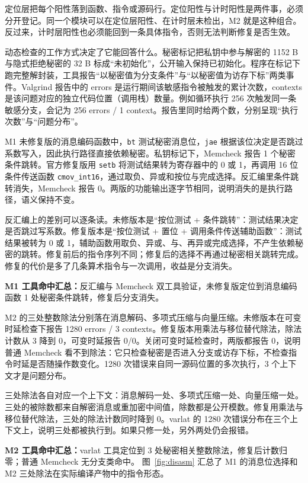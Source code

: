 定位层把每个阳性落到函数、指令或源码行。定位阳性与计时阳性是两件事，必须分开登记。同一个模块可以在定位层阳性、在计时层未检出，M2 就是这种组合。反过来，计时层阳性也必须能回到一条具体指令，否则无法判断修复是否生效。

动态检查的工作方式决定了它能回答什么。秘密标记把私钥中参与解密的 1152 B 与隐式拒绝秘密的 32 B 标成“未初始化”，公开输入保持已初始化。程序在标记下跑完整解封装，工具报告“以秘密值为分支条件”与“以秘密值为访存下标”两类事件。Valgrind 报告中的 errors 是运行期间该敏感指令被触发的累计次数，contexts 是该问题对应的独立代码位置（调用栈）数量。例如循环执行 256 次触发同一条敏感分支，会记为 256 errors / 1 context。报告里同时给两个数，分别呈现“执行次数”与“问题分布”。

M1 未修复版的消息编码函数中，\texttt{bt} 测试秘密消息位，\texttt{jae} 根据该位决定是否跳过系数写入，因此执行路径直接依赖秘密。私钥标记下，Memcheck 报告 1 个秘密条件跳转。官方修复版用 \texttt{setb} 将测试结果转为寄存器中的 0 或 1，再调用 16 位条件传送函数 \texttt{cmov\_int16}，通过取负、异或和按位与完成选择。反汇编里条件跳转消失，Memcheck 报告 0。两版的功能输出逐字节相同，说明消失的是执行路径，语义保持不变。\cite{clangover} %

反汇编上的差别可以逐条读。未修版本是“按位测试 + 条件跳转”：测试结果决定是否跳过写系数。修复版本是“按位测试 + 置位 + 调用条件传送辅助函数”：测试结果被转为 0 或 1，辅助函数用取负、异或、与、再异或完成选择，不产生依赖秘密的跳转。修复前后的指令序列不同；修复后的选择不再通过秘密相关跳转完成。修复的代价是多了几条算术指令与一次调用，收益是分支消失。

\par\smallskip\noindent\textbf{M1 工具命中汇总：}反汇编与 Memcheck 双工具验证，未修复版定位到消息编码函数 1 处秘密条件跳转，修复后分支消失。

M2 的三处整数除法分别落在消息解码、多项式压缩与向量压缩。未修版本在可变时延检查下报告 1280 errors / 3 contexts。修复版本用乘法与移位替代除法，除法计数从 3 降到 0，可变时延报告 0/0。关闭可变时延检查时，两版都报告 0，说明普通 Memcheck 看不到除法：它只检查秘密是否进入分支或访存下标，不检查指令时延是否随操作数变化。1280 次错误来自同一源码位置的多次执行，3 个上下文才是问题分布。\cite{kyberslash} %

三处除法各自对应一个上下文：消息解码一处、多项式压缩一处、向量压缩一处。三处的被除数都来自解密消息或重加密中间值，除数都是公开模数。修复用乘法与移位替代除法，三处的除法计数同时降到 0。varlat 的 1280 次错误分布在三个上下文上，说明三处都被执行到。如果只修一处，另外两处仍会报错。

\par\smallskip\noindent\textbf{M2 工具命中汇总：}varlat 工具定位到 3 处秘密相关整数除法，修复后计数归零；普通 Memcheck 无分支类命中。
图~\ref{fig:disasm} 汇总了 M1 的消息位选择和 M2 三处除法在实际编译产物中的指令形态。

